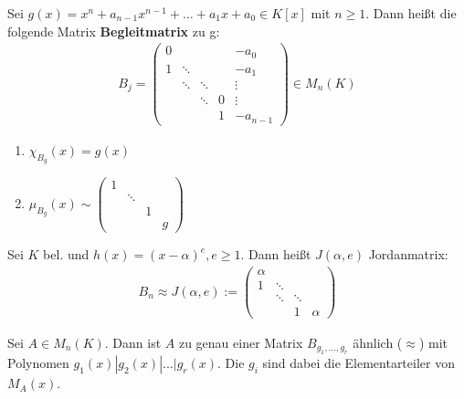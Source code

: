 \begin{definition}
Sei $g(x) = x^n + a_{n-1}x^{n-1}+\ldots+a_1x + a_0 \in K[x]$ mit $n \geq 1$. Dann heißt die folgende Matrix \textbf{Begleitmatrix} zu g:
\begin{align*}
B_j =
\begin{pmatrix}
0 &        &		&  & -a_0 \\
1 & \ddots &		&  & -a_1 \\
  & \ddots & \ddots	&  & \vdots \\
  &        & \ddots	& 0 & \vdots \\
  &        &		& 1 & -a_{n-1}
\end{pmatrix}
\in M_n(K)
\end{align*} 
\end{definition}

\begin{remark}
\leavevmode
\begin{enumerate}
	\item $\chi_{B_g}(x) = g(x)$
	\item $\mu_{B_g}(x) \sim 
	\begin{pmatrix}
		1 &        & & \\
		  & \ddots & & \\
		  &        &1& \\
		  &        & & g
	\end{pmatrix}$
\end{enumerate}
\end{remark}


\begin{definition}
Sei $K$ bel. und $h(x)=(x-\alpha)^e, e \geq 1$. Dann heißt $J(\alpha,e)$ Jordanmatrix:
\begin{align*}
B_n \approx J(\alpha,e) :=
\begin{pmatrix}
\alpha &        &   &\\
1      & \ddots &   &\\
       & \ddots & \ddots &\\
       &        & 1 & \alpha
\end{pmatrix}
\end{align*}
\end{definition}

\begin{theorem}
Sei $A \in M_n(K)$. Dann ist $A$ zu genau einer Matrix $B_{g_1,...,g_r}$ ähnlich ($\approx$) mit Polynomen $g_1(x) | g_2(x)| ... | g_r(x)$. Die $g_i$ sind dabei die Elementarteiler von $M_A(x)$.
\end{theorem}
